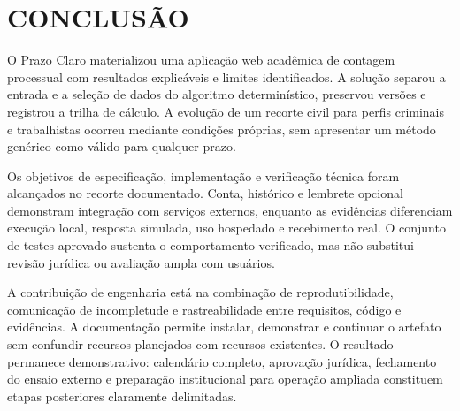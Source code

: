 \chapter{CONCLUSÃO}
\label{chapter-7}
O Prazo Claro materializou uma aplicação web acadêmica de contagem processual com resultados explicáveis e limites identificados. A solução separou a entrada e a seleção de dados do algoritmo determinístico, preservou versões e registrou a trilha de cálculo. A evolução de um recorte civil para perfis criminais e trabalhistas ocorreu mediante condições próprias, sem apresentar um método genérico como válido para qualquer prazo.

Os objetivos de especificação, implementação e verificação técnica foram alcançados no recorte documentado. Conta, histórico e lembrete opcional demonstram integração com serviços externos, enquanto as evidências diferenciam execução local, resposta simulada, uso hospedado e recebimento real. O conjunto de testes aprovado sustenta o comportamento verificado, mas não substitui revisão jurídica ou avaliação ampla com usuários.

A contribuição de engenharia está na combinação de reprodutibilidade, comunicação de incompletude e rastreabilidade entre requisitos, código e evidências. A documentação permite instalar, demonstrar e continuar o artefato sem confundir recursos planejados com recursos existentes. O resultado permanece demonstrativo: calendário completo, aprovação jurídica, fechamento do ensaio externo e preparação institucional para operação ampliada constituem etapas posteriores claramente delimitadas.
